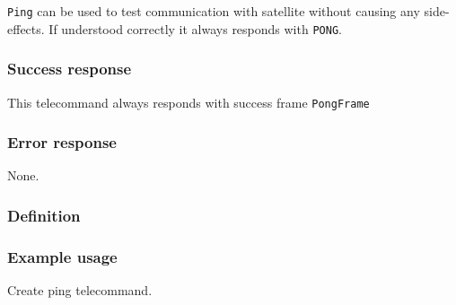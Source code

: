 \texttt{Ping} can be used to test communication with satellite without causing any side-effects. If understood correctly it always responds with \texttt{PONG}.

\subsubsection{Success response}
This telecommand always responds with success frame \texttt{PongFrame}

\subsubsection{Error response}
None.

\subsubsection{Definition}


\subsubsection{Example usage}
Create ping telecommand.

